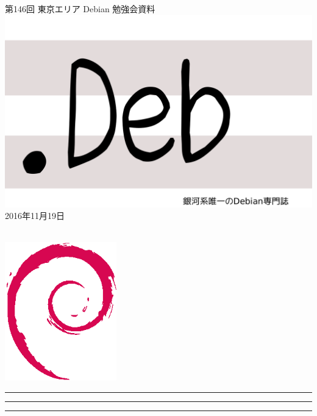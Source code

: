 \documentclass[mingoth,a4paper]{jsarticle}
\newcommand{\debmtgyear}{2016}
\newcommand{\debmtgmonth}{11}
\newcommand{\debmtgdate}{19}
\newcommand{\debmtgnumber}{146}
\begin{document}
\begin{titlepage}
\thispagestyle{empty}

\vspace*{-2cm}
第\debmtgnumber{}回 東京エリア Debian 勉強会資料\\
\hspace*{-2cm}
\includegraphics{image2012-natsu/dotdeb.pdf}\\
\hfill{}\debmtgyear{}年\debmtgmonth{}月\debmtgdate{}日

\\

\vspace*{-2cm}
\hfill{}\includegraphics[height=6cm]{image200502/openlogo-nd.eps}
\end{titlepage}

\newpage

\begin{minipage}[b]{0.2\hsize}
 \colorbox{titleback}{}
\end{minipage}
\begin{minipage}[b]{0.8\hsize}
\hrule
\vspace{2mm}
\hrule
\begin{multicols}{2}
\tableofcontents
\end{multicols}
\vspace{2mm}
\hrule
\end{minipage}
\end{document}
